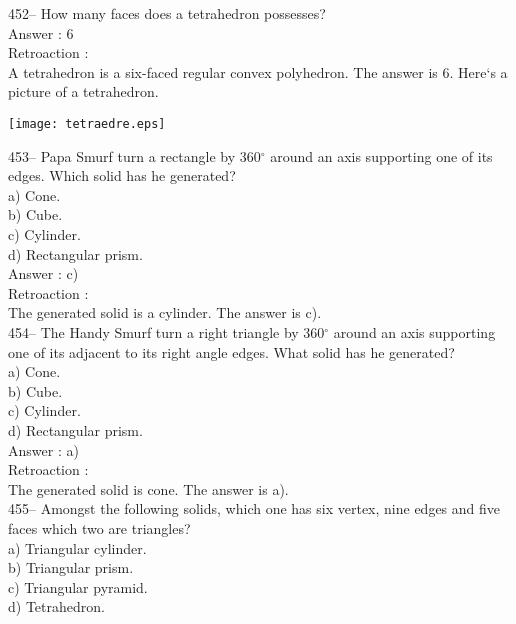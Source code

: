 ﻿\documentclass[letterpaper, 12pt]{article}
\begin{document}
452-- How many faces does a tetrahedron possesses?\\

Answer : 6\\

Retroaction : \\
A tetrahedron is a six-faced regular convex polyhedron.  The answer is 6.  Here`s a picture of a tetrahedron.\\
    \begin{center}
    \texttt{[image: tetraedre.eps]}
    \end{center}


453--  Papa Smurf turn a rectangle by 360$^{\circ}$ around an axis supporting one of its edges. Which solid has he generated?\\
a) Cone.\\
b) Cube.\\
c) Cylinder.\\
d) Rectangular prism.\\


Answer : c)\\

Retroaction :\\
The generated solid is a cylinder.  The answer is c).\\


454--  The Handy Smurf turn a right triangle by 360$^{\circ}$ around an axis supporting one of its adjacent to its right angle edges. What solid has he generated?\\
a) Cone.\\
b) Cube.\\
c) Cylinder.\\
d) Rectangular prism.\\

Answer : a)\\

Retroaction :\\
The generated solid is cone.  The answer is a).\\

455-- Amongst the following solids, which one has six vertex, nine edges and five faces which two are triangles?\\
a) Triangular cylinder.\\
b) Triangular prism.\\
c) Triangular pyramid.\\
d) Tetrahedron.\\
\end{document}
